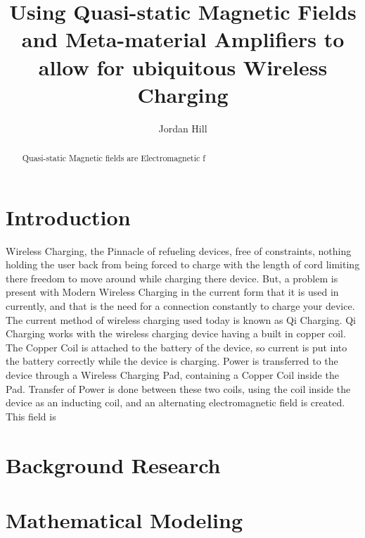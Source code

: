 \documentclass[]{article}
\title{Using Quasi-static Magnetic Fields and Meta-material Amplifiers to allow for ubiquitous Wireless Charging}
\author{Jordan Hill}
\begin{document}
\maketitle

\begin{abstract}
Quasi-static Magnetic fields are Electromagnetic f
\end{abstract}

\section{Introduction}
Wireless Charging, the Pinnacle of refueling devices, free of constraints, nothing holding the user back from being forced to charge with the length of cord limiting there freedom to move around while charging there device. But, a problem is present with Modern Wireless Charging in the current form that it is used in currently, and that is the need for a connection constantly to charge your device. The current method of wireless charging used today is known as Qi Charging. Qi Charging works with the wireless charging device having a built in copper coil. The Copper Coil is attached to the battery of the device, so current is put into the battery correctly while the device is charging. Power is transferred to the device through a Wireless Charging Pad, containing a Copper Coil inside the Pad. Transfer of Power is done between these two coils, using the coil inside the device as an inducting coil, and an alternating electromagnetic field is created. This field is 
\section{Background Research}

\section{Mathematical Modeling}
\end{document}
